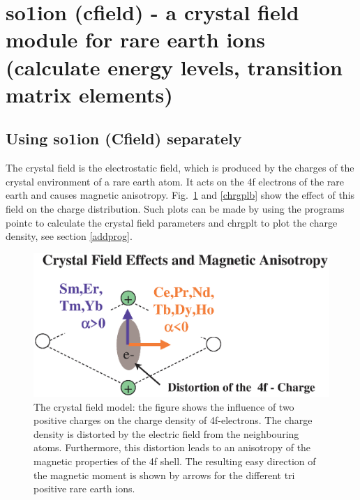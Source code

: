 \section{{\prg so1ion} ({\prg cfield}) - a crystal field module for rare earth %
ions (calculate energy levels, transition matrix elements)}\label{cfield}

\subsection{Using {\prg so1ion} ({\prg Cfield}) separately}
\label{cfieldsep}

The crystal field is the electrostatic field, which is produced by the
charges of the crystal environment of a rare earth atom. It acts on the
4f electrons of the rare earth and causes magnetic anisotropy. Fig.~\ref{chrgpla} and
\ref{chrgplb} show the effect of this field on the charge distribution.
Such plots can be made by using the programs {\prg pointc} to calculate
the crystal field parameters and
 {\prg chrgplt} to plot the charge density, see section \ref{addprog}.

\begin{figure}[hb]
\includegraphics[angle=0,width=0.7\columnwidth]{figsrc/crystalfieldplot.eps}
\caption{\label{chrgpla}
The crystal field model: the figure shows the influence of two positive 
charges on the charge density of 4f-electrons. The
charge density is distorted by the electric field from the neighbouring atoms.
Furthermore, this distortion leads to an anisotropy of the magnetic properties
of the 4f shell. The resulting 
easy direction of the magnetic moment is shown by arrows for the different tri positive
rare earth ions.} 
\end{figure}

